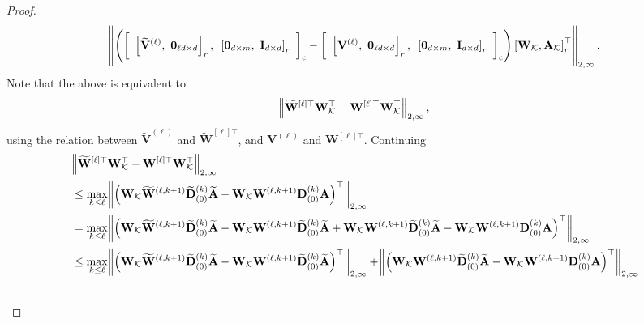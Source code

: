 \begin{proof}
	\begin{align*}
		\norm{ \left( \left[\text{ }\left[\widetilde{\mathbf{V}}^{(\ell) }, \text{ } \mathbf{0}_{\ell d \times d}\right]_r,\text{ } \left[\mathbf{0}_{d \times m},\text{ } \mathbf{I}_{d \times d}\right]_r\text{ }\right]_c  - \left[\text{ }\left[\mathbf{V}^{(\ell)}, \text{ } \mathbf{0}_{\ell d \times d}\right]_r,\text{ } \left[\mathbf{0}_{d \times m},\text{ } \mathbf{I}_{d \times d}\right]_r\text{ }\right]_c  \right) \left[\mathbf{W}_{\mathcal{K}}, \mathbf{A}_{\mathcal{K}} \right]_r^{\top} }_{2, \infty}.
	\end{align*}
	Note that the above is equivalent to
	\begin{align*}
		\norm{\widetilde{\mathbf{W}}^{[\ell]\top} \mathbf{W}_{\mathcal{K}}^{\top} - \mathbf{W}^{[\ell]\top} \mathbf{W}_{\mathcal{K}}^{\top} }_{2, \infty},
	\end{align*}
	using the relation between $\widetilde{\mathbf{V}}^{(\ell) }$ and $\widetilde{\mathbf{W}}^{[\ell]\top}$, and $\mathbf{V}^{(\ell) }$ and $\mathbf{W}^{[\ell]\top}$. Continuing
	\begingroup \allowdisplaybreaks
	\begin{align}
		&\norm{\widetilde{\mathbf{W}}^{[\ell]\top} \mathbf{W}_{\mathcal{K}}^{\top} - \mathbf{W}^{[\ell]\top} \mathbf{W}_{\mathcal{K}}^{\top} }_{2, \infty}
		\nonumber\\&
		\le \max_{k \le \ell} \norm{\left(\mathbf{W}_{\mathcal{K}} \widetilde{\mathbf{W}}^{(\ell, k+1)} \widetilde{\mathbf{D}}_{(0)}^{(k)} \widetilde{\mathbf{A}} - \mathbf{W}_{\mathcal{K}} \mathbf{W}^{(\ell, k+1)} \mathbf{D}_{(0)}^{(k)} \mathbf{A}\right)^{\top}}_{2, \infty} \nonumber\\&
		= \max_{k \le \ell} \norm{\left(\mathbf{W}_{\mathcal{K}} \widetilde{\mathbf{W}}^{(\ell, k+1)} \widetilde{\mathbf{D}}_{(0)}^{(k)} \widetilde{\mathbf{A}} - \mathbf{W}_{\mathcal{K}} \mathbf{W}^{(\ell, k+1)} \widetilde{\mathbf{D}}_{(0)}^{(k)} \widetilde{\mathbf{A}} + \mathbf{W}_{\mathcal{K}} \mathbf{W}^{(\ell, k+1)} \widetilde{\mathbf{D}}_{(0)}^{(k)} \widetilde{\mathbf{A}} - \mathbf{W}_{\mathcal{K}} \mathbf{W}^{(\ell, k+1)} \mathbf{D}_{(0)}^{(k)} \mathbf{A}\right)^{\top}}_{2, \infty}  \nonumber\\&
		\le \max_{k \le \ell} \norm{\left(\mathbf{W}_{\mathcal{K}} \widetilde{\mathbf{W}}^{(\ell, k+1)} \widetilde{\mathbf{D}}_{(0)}^{(k)} \widetilde{\mathbf{A}} - \mathbf{W}_{\mathcal{K}} \mathbf{W}^{(\ell, k+1)} \widetilde{\mathbf{D}}_{(0)}^{(k)} \widetilde{\mathbf{A}}\right)^{\top}}_{2, \infty} + \norm{\left(\mathbf{W}_{\mathcal{K}} \mathbf{W}^{(\ell, k+1)} \widetilde{\mathbf{D}}_{(0)}^{(k)} \widetilde{\mathbf{A}} - \mathbf{W}_{\mathcal{K}} \mathbf{W}^{(\ell, k+1)} \mathbf{D}_{(0)}^{(k)} \mathbf{A}\right)^{\top}}_{2, \infty} \nonumber\\&

\end{align}
\end{proof}

